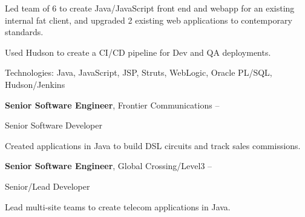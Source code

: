 \documentclass[MMMMyyyy,nonstopmode]{simpleresumecv_stacked}
\newcommand{\tech}[1]{\Gap\textrm{Technologies:} #1}
\newcommand{\comment}[1]{\ignorespaces} %
\newif\ifLOCATION
\begin{document}
\begin{Body}
\begin{Detail}
Led team of 6 to create Java/JavaScript front end and webapp for an existing internal fat client, and upgraded 2 existing web applications to contemporary standards. 

Used Hudson to create a CI/CD pipeline for Dev and QA deployments.

\iffalse
\BulletItem
Member of architecture team to research and set five-year strategy for web application strategy.
\fi

\tech{Java, JavaScript, JSP, Struts, WebLogic, Oracle PL/SQL, Hudson/Jenkins}
\end{Detail}
\fi %

\Entry
\textbf{Senior Software Engineer}, Frontier Communications
\hfill 
 -- 

Senior Software Developer
\ifLOCATION
\hfill
Rochester, New York
\fi

\begin{Detail}
Created applications in Java to build DSL circuits and track sales commissions.


\end{Detail}

\Entry
\textbf{Senior Software Engineer}, Global Crossing/Level3
\hfill 
 -- 

Senior/Lead Developer
\ifLOCATION
\hfill
Rochester, New York
\fi

\begin{Detail}
Lead multi-site teams to create telecom applications in Java.

\end{Detail}


\end{Body}
\end{document}
